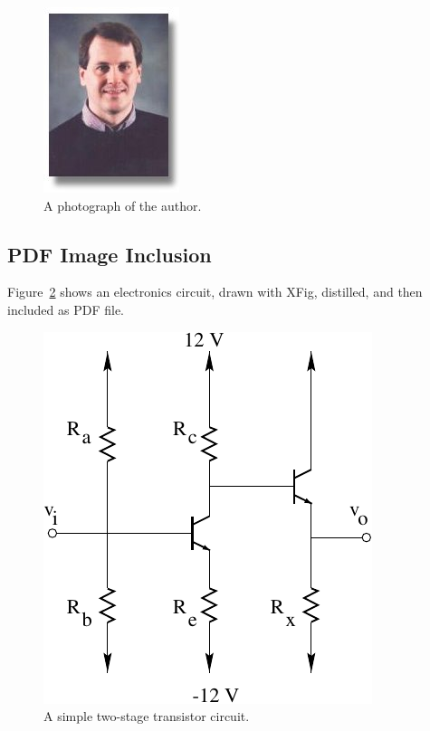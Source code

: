 \documentclass{article}
\begin{document}
\begin{figure}
  \begin{center}
    \includegraphics{mwicks.jpeg}
  \end{center}

  \caption{A photograph of the author.}
  \label{fig:author}
\end{figure}

\subsection{PDF Image Inclusion}
Figure~\ref{fig:circuit} shows
an electronics circuit,
drawn with XFig, distilled,
and then included as PDF file.
\begin{figure}
  \begin{center}
     \includegraphics{transistor}
  \end{center}

  \caption{A simple two-stage transistor circuit.}
  \label{fig:circuit}
\end{figure}
\end{document}
